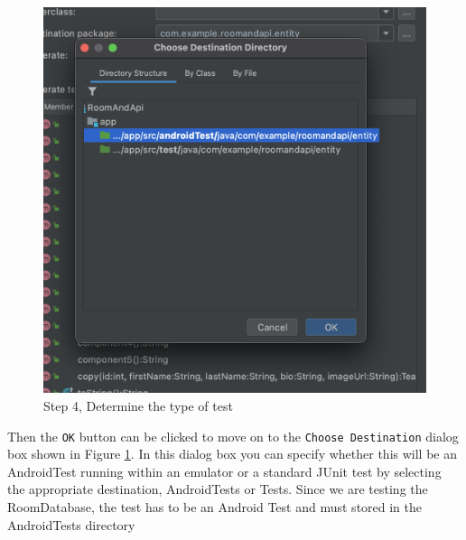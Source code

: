 \documentclass[12pt]{article}
\begin{document}
\begin{figure}[H]
    \centering
    \includegraphics[trim=10 10 10 50, clip, width=\textwidth] {images/testing/4_pick_test_type.png}
    \caption{Step 4, Determine the type of test}
    \label{fig:test_step_4}
\end{figure}
 Then the \verb|OK| button can be clicked to move on to the \verb|Choose Destination| dialog box shown in Figure \ref{fig:test_step_4}. In this dialog box you can specify whether this will be an AndroidTest running within an emulator or a standard JUnit test by selecting the appropriate destination, AndroidTests or Tests. Since we are testing the RoomDatabase, the test has to be an Android Test and must stored in the AndroidTests directory
\end{document}
